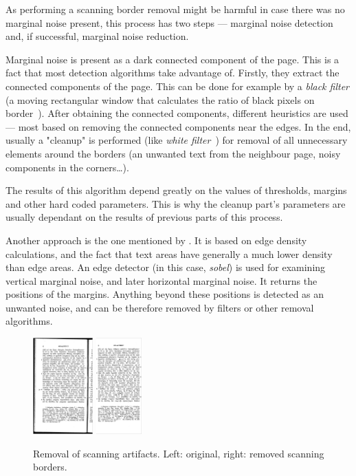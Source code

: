 As performing a scanning border removal might be harmful in case there was no marginal noise present, this process has two steps --- marginal noise detection and, if successful, marginal noise reduction.

Marginal noise is present as a dark connected component of the page. This is a fact that most detection algorithms take advantage of. Firstly, they extract the connected components of the page. This can be done for example by a \emph{black filter} (a moving rectangular window that calculates the ratio of black pixels on border~\citep{marginalNoiseWindow}). After obtaining the connected components, different heuristics are used --- most based on removing the connected components near the edges. In the end, usually a "cleanup" is performed (like \emph{white filter}~\citep{marginalNoiseWindow}) for removal of all unnecessary elements around the borders (an unwanted text from the neighbour page, noisy components in the corners\ldots).

The results of this algorithm depend greatly on the values of thresholds, margins and other hard coded parameters. This is why the cleanup part's parameters are usually dependant on the results of previous parts of this process.

Another approach is the one mentioned by \citet{marginalNoiseEdge}. It is based on edge density calculations, and the fact that text areas have generally a much lower density than edge areas. An edge detector (in this case, \emph{sobel}) is used for examining vertical marginal noise, and later horizontal marginal noise. It returns the positions of the margins. Anything beyond these positions is detected as an unwanted noise, and can be therefore removed by filters or other removal algorithms.

\begin{figure}
\centering

\includegraphics[height=10em]{img/preprocessing/scan_borders_orig.png}
\qquad
\includegraphics[height=10em]{img/preprocessing/scan_borders_result.png}

\caption{Removal of scanning artifacts. Left: original, right: removed scanning borders.}
\label{fig:scanning}
\end{figure}

